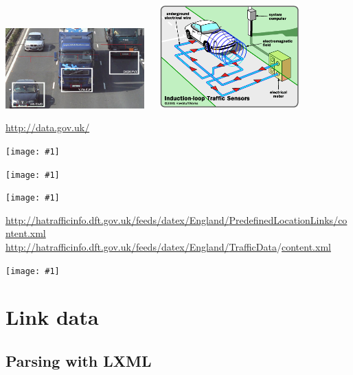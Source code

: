 \documentclass[aspectratio=169]{beamer}
\newcommand{\alerturl}[1]{\alert{\url{#1}}}
\newcommand{\tallimage}[1]{%
  \begin{frame}
    \centering
    \texttt{[image: \#1]}
    \\
  \end{frame}
}
\newcommand{\wideimage}[1]{%
  \begin{frame}
    \centering
    \texttt{[image: \#1]}
    \\
  \end{frame}
}
\begin{document}
\begin{frame}
  \centering
  \includegraphics[width=0.4\textwidth]{img/anpr.jpg}
  $\quad$
  \includegraphics[width=0.4\textwidth]{img/loop.png}
  \\
\end{frame}

\begin{frame}
  \Huge\centering
  \url{http://data.gov.uk/}
  \\
\end{frame}

\tallimage{img/data-gov-uk.png}
\tallimage{img/data-page.png}
\wideimage{img/data-page-crop.png}

\begin{frame}
  \Large\centering
  \url{http://hatrafficinfo.dft.gov.uk/feeds/datex/England/}\alerturl{PredefinedLocationLinks}\url{/content.xml}
  \\
  \vspace{1\baselineskip}
  \url{http://hatrafficinfo.dft.gov.uk/feeds/datex/England/}\alerturl{TrafficData}/\url{content.xml}
  \\
\end{frame}

\tallimage{img/datex2.png}

\section{Link data}

\subsection{Parsing with LXML}
\begin{frame}
  \inputminted{xml}{document.xml}
  \vspace{\baselineskip}
  \inputminted{python}{lxml_objectify.py}
\end{frame}
\end{document}
